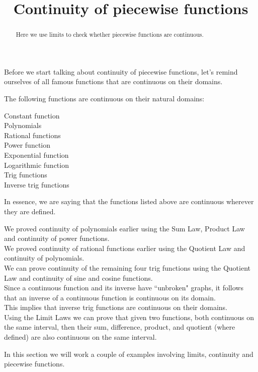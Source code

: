 \documentclass{ximera}
\title[Dig-In:]{Continuity of piecewise functions}
\begin{document}
\begin{abstract}
Here we use limits to check whether piecewise functions are continuous.
\end{abstract}
\maketitle
Before we start talking about continuity of piecewise functions, let's remind ourselves of all famous functions that are continuous on their domains.
\begin{theorem}\label{theorem:continuity}
The following functions are continuous on their natural domains:
\begin{description}
\item[Constant function]
\item[Polynomials]
\item[Rational functions]
\item[Power function]
\item[Exponential function] 
\item[Logarithmic function] 
\item[Trig functions]  
\item[Inverse trig functions]     
\end{description}
In essence, we are saying that the functions listed above are
continuous wherever they are defined.

We  proved continuity of polynomials earlier using the Sum Law, Product Law and continuity of power functions.\\
We  proved continuity of rational functions earlier using the Quotient Law and  continuity of polynomials.\\
We can  prove continuity of the remaining four trig functions using the Quotient Law and continuity of sine and cosine functions.\\

Since a continuous function and its inverse have ``unbroken" graphs, it follows that an inverse of a continuous function is continuous on its domain.\\
This implies that inverse trig functions are continuous on their domains. \\


Using the Limit Laws we can prove that given two functions, both continuous on the same  interval, then their sum, difference, product, and quotient (where defined) are also continuous on the same interval. 




\end{theorem}
In this section we will work a couple of examples involving limits,
continuity and piecewise functions.
\end{document}
